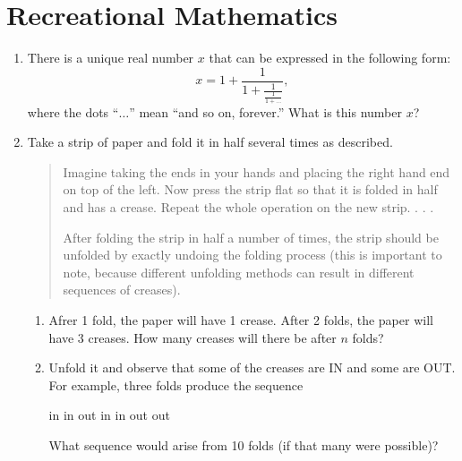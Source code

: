\section*{Recreational Mathematics}
\begin{enumerate}
	\item There is a unique real number \(x\) that can be expressed in the following form:
	\[ x= 1+\frac{1}{1+\frac{1}{\frac{1}{1+ \dots}}},\]
	where the dots ``\(\dots\)'' mean ``and so on, forever.'' What is this number \(x\)? \vfill
	
	\item Take a strip of paper and fold it in half several times as described. 
	\begin{quote}
	Imagine taking the ends in your hands and placing the right hand end on top of the left. Now press the strip flat so that it is
folded in half and has a crease. Repeat the whole operation on the new strip. . . .

After folding the strip in half a number of times, the strip should be unfolded by exactly undoing the folding process (this is important to note, because different unfolding methods can result in different sequences of creases).
	\end{quote}
	
\begin{enumerate}
	\item Afrer 1 fold, the paper will have 1 crease. After 2 folds, the paper will have 3 creases. 
	How many creases will there be after \(n\) folds? \vfill
	\item Unfold it and observe that some of the creases are IN and some are OUT. For example, three folds produce the sequence 
	\begin{center}
	in in out in in out out
\end{center}
What sequence would arise from 10 folds (if that many were possible)?
\vfill
\end{enumerate}
\end{enumerate}